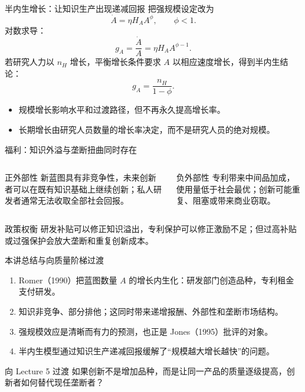 \documentclass[aspectratio=32]{beamer}
\begin{document}
\begin{frame}{半内生增长：让知识生产出现递减回报}
\small
把强规模设定改为
\[
  \dot A=\eta H_AA^\phi,
  \qquad \phi<1.
\]
对数求导：
\[
  g_A=\frac{\dot A}{A}=\eta H_AA^{\phi-1}.
\]
若研究人力以 $n_H$ 增长，平衡增长条件要求 $A$ 以相应速度增长，得到半内生结论：
\[
  \boxed{g_A=\frac{n_H}{1-\phi}}.
\]
\begin{itemize}
  \item 规模增长影响水平和过渡路径，但不再永久提高增长率。
  \item 长期增长由研究人员数量的增长率决定，而不是研究人员的绝对规模。
\end{itemize}
\end{frame}

\begin{frame}{福利：知识外溢与垄断扭曲同时存在}
\small
\begin{columns}[T]
\begin{block}{正外部性}
新蓝图具有非竞争性，未来创新者可以在既有知识基础上继续创新；私人研发者通常无法收取全部社会回报。
\end{block}
\begin{block}{负外部性}
专利带来中间品加成，使用量低于社会最优；创新可能重复、阻塞或带来商业窃取。
\end{block}
\end{columns}
\vspace{0.18cm}
\begin{alertblock}{政策权衡}
研发补贴可以修正知识溢出，专利保护可以修正激励不足；但过高补贴或过强保护会放大垄断和重复创新成本。
\end{alertblock}
\end{frame}

\begin{frame}{本讲总结与向质量阶梯过渡}
\small
\begin{enumerate}
  \item Romer（1990）把蓝图数量 $A$ 的增长内生化：研发部门创造品种，专利租金支付研发。
  \item 知识非竞争、部分排他；这同时带来递增报酬、外部性和垄断市场结构。
  \item 强规模效应是清晰而有力的预测，也正是 Jones（1995）批评的对象。
  \item 半内生模型通过知识生产递减回报缓解了“规模越大增长越快”的问题。
\end{enumerate}
\begin{block}{向 Lecture 5 过渡}
如果创新不是增加品种，而是让同一产品的质量逐级提高，创新者如何替代现任垄断者？
\end{block}
\end{frame}
\end{document}
